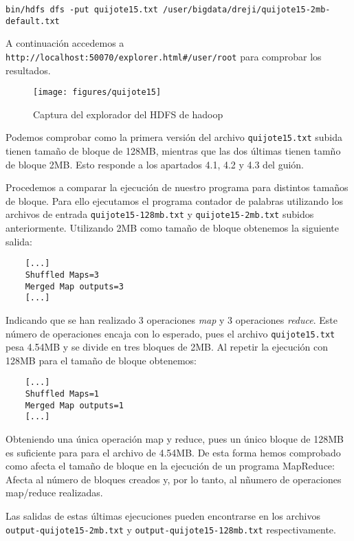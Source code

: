 \documentclass[11pt]{article}
\def\inline{\lstinline[basicstyle=\ttfamily,keywordstyle={}]}
\begin{document}
\begin{verbatim}
bin/hdfs dfs -put quijote15.txt /user/bigdata/dreji/quijote15-2mb-default.txt
\end{verbatim}

A continuación accedemos a \inline{http://localhost:50070/explorer.html#/user/root} para comprobar los resultados.

\begin{figure}[H]
  \centering
  \texttt{[image: figures/quijote15]}
  \caption{Captura del explorador del HDFS de hadoop}
\end{figure}

Podemos comprobar como la primera versión del archivo \inline{quijote15.txt} subida tienen tamaño de bloque de 128MB, mientras que las dos últimas tienen tamño de bloque 2MB. Esto responde a los apartados 4.1, 4.2 y 4.3 del guión.

Procedemos a comparar la ejecución de nuestro programa para distintos tamaños de bloque. Para ello ejecutamos el programa contador de palabras utilizando los archivos de entrada \inline{quijote15-128mb.txt} y \inline{quijote15-2mb.txt} subidos anteriormente. Utilizando 2MB como tamaño de bloque obtenemos la siguiente salida:

\begin{verbatim}
	[...]
	Shuffled Maps=3
	Merged Map outputs=3
	[...]
\end{verbatim}

Indicando que se han realizado 3 operaciones \emph{map} y 3 operaciones \emph{reduce}. Este número de operaciones encaja con lo esperado, pues el archivo \inline{quijote15.txt} pesa 4.54MB y se divide en tres bloques de 2MB. Al repetir la ejecución con 128MB para el tamaño de bloque obtenemos:

\begin{verbatim}
	[...]
	Shuffled Maps=1
	Merged Map outputs=1
	[...]
\end{verbatim}

Obteniendo una única operación map y reduce, pues un único bloque de 128MB es suficiente para para el archivo de 4.54MB. De esta forma hemos comprobado como afecta el tamaño de bloque en la ejecución de un programa MapReduce: Afecta al número de bloques creados y, por lo tanto, al nñumero de operaciones map/reduce realizadas.

Las salidas de estas últimas ejecuciones pueden encontrarse en los archivos \inline{output-quijote15-2mb.txt} y \inline{output-quijote15-128mb.txt} respectivamente.
\end{document}
